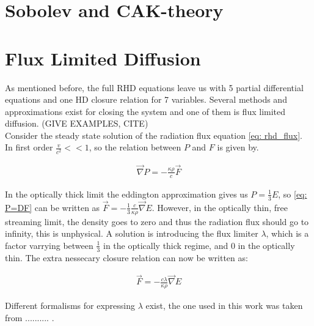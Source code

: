 \section{Sobolev and CAK-theory}


\section{Flux Limited Diffusion} \label{section: introduction Flux Limited Diffusion}
As mentioned before, the full RHD equations leave us with 5 partial differential equations and one HD closure relation for 7 variables. Several methods and approximations exist for closing the system and one of them is flux limited diffusion. (GIVE EXAMPLES, CITE)\\

Consider the steady state solution of the radiation flux equation \eqref{eq: rhd_flux}. In first order $\frac{v}{c^2} << 1$, so the relation between $P$ and $F$ is given by.

\begin{align}
\vec{\nabla} P = - \frac{\kappa \rho}{c} \vec{F} \label{eq: P=DF}
\end{align}

In the optically thick limit the eddington approximation gives us $P = \frac{1}{3}E$, so \eqref{eq: P=DF} can be written as $\vec{F} = -\frac{1}{3}\frac{c}{\kappa \rho} \vec{\nabla}E$. However, in the optically thin, free streaming limit, the density goes to zero and thus the radiation flux should go to infinity, this is unphysical. A solution is introducing the flux limiter $\lambda$, which is a factor varrying between $\frac{1}{3}$ in the optically thick regime, and $0$ in the optically thin. The extra nessecary closure relation can now be written as:

\begin{align}
\vec{F} = -\frac{c\lambda}{\kappa \rho} \vec{\nabla}E
\end{align}

Different formalisms for expressing $\lambda$ exist, the one used in this work was taken from .......... .